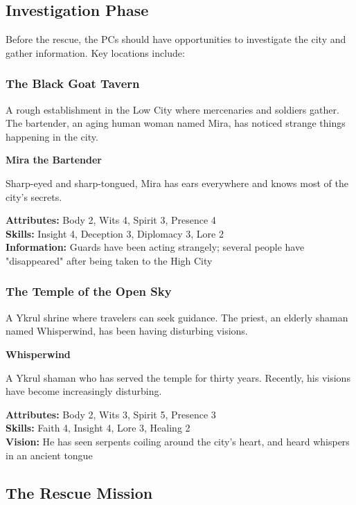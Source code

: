 \documentclass[12pt,twoside]{article}
\newenvironment{npcbox}[1]{
  \begin{mdframed}[
    linewidth=1pt,
    linecolor=dungeongray,
    backgroundcolor=white,
    innertopmargin=5pt,
    innerbottommargin=5pt,
    innerrightmargin=5pt,
    innerleftmargin=5pt
  ]
  \textbf{#1}
}{\end{mdframed}}
\begin{document}
\subsection{Investigation Phase}

Before the rescue, the PCs should have opportunities to investigate the city and gather information. Key locations include:

\subsubsection{The Black Goat Tavern}

A rough establishment in the Low City where mercenaries and soldiers gather. The bartender, an aging human woman named Mira, has noticed strange things happening in the city.

\begin{npcbox}{Mira the Bartender}
Sharp-eyed and sharp-tongued, Mira has ears everywhere and knows most of the city's secrets.

\textbf{Attributes:} Body 2, Wits 4, Spirit 3, Presence 4 \\
\textbf{Skills:} Insight 4, Deception 3, Diplomacy 3, Lore 2 \\
\textbf{Information:} Guards have been acting strangely; several people have "disappeared" after being taken to the High City
\end{npcbox}

\subsubsection{The Temple of the Open Sky}

A Ykrul shrine where travelers can seek guidance. The priest, an elderly shaman named Whisperwind, has been having disturbing visions.

\begin{npcbox}{Whisperwind}
A Ykrul shaman who has served the temple for thirty years. Recently, his visions have become increasingly disturbing.

\textbf{Attributes:} Body 2, Wits 3, Spirit 5, Presence 3 \\
\textbf{Skills:} Faith 4, Insight 4, Lore 3, Healing 2 \\
\textbf{Vision:} He has seen serpents coiling around the city's heart, and heard whispers in an ancient tongue
\end{npcbox}

\subsection{The Rescue Mission}
\end{document}
